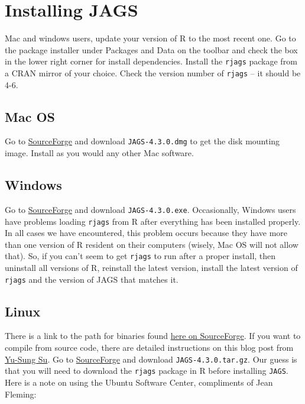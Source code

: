 \documentclass[12pt,english]{article}
\begin{document}
\section{Installing JAGS}

Mac and windows users, update your version of R to the most recent one. Go to the package installer under \textsf{Packages and Data} on the toolbar and check the box in the lower right corner for \textsf{install dependencies}. Install the \texttt{rjags} package \citep{Plummer2016rjags} from a CRAN mirror of your choice. Check the version number of \texttt{rjags} -- it should be 4-6. 

\subsection{Mac OS}

Go to \href{https://sourceforge.net/projects/mcmc-jags/files/JAGS/4.x/Mac}{SourceForge} and download \texttt{JAGS-4.3.0.dmg} to get the disk mounting image. Install as you would any other Mac software.

\subsection{Windows}

Go to \href{https://sourceforge.net/projects/mcmc-jags/files/JAGS/4.x/Windows}{SourceForge} and download \texttt{JAGS-4.3.0.exe}. Occasionally, Windows users have problems loading \texttt{rjags} from R after everything has been installed properly. In all cases we have encountered, this problem occurs because they have more than one version of R resident on their computers (wisely, Mac OS will not allow that). So, if you can't seem to get \texttt{rjags} to run after a proper install, then uninstall all versions of R, reinstall the latest version, install the latest version of \texttt{rjags} and the version of JAGS that matches it. 

\subsection{Linux}

There is a link to the path for binaries found \href{http://mcmc-jags.sourceforge.net}{here on SourceForge}. If you want to compile from source code, there are detailed instructions on this blog post from \href{http://yusung.blogspot.com/2009/01/install-jags-and-rjags-in-fedora.html}{Yu-Sung Su}. Go to \href{https://sourceforge.net/projects/mcmc-jags/files/JAGS/4.x/Source/}{SourceForge} and download \texttt{JAGS-4.3.0.tar.gz}. Our guess is that you will need to download the \texttt{rjags} package in R before installing \texttt{JAGS}.  Here is a note on using the Ubuntu Software Center, compliments of Jean Fleming:
\end{document}
